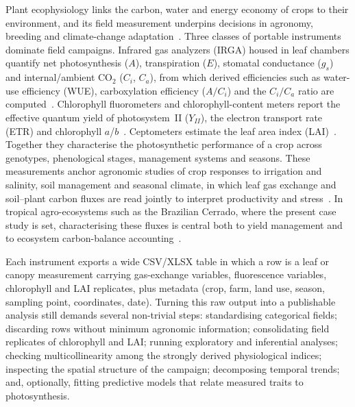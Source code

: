 \documentclass[preprint,12pt,a4paper]{elsarticle}
\begin{document}
Plant ecophysiology links the carbon, water and energy economy of crops to their environment, and its field measurement underpins decisions in agronomy, breeding and climate-change adaptation~\cite{Lambers2008,Long2006}. Three classes of portable instruments dominate field campaigns. Infrared gas analyzers (IRGA) housed in leaf chambers quantify net photosynthesis ($A$), transpiration ($E$), stomatal conductance ($g_s$) and internal/ambient CO$_2$ ($C_i$, $C_a$), from which derived efficiencies such as water-use efficiency (WUE), carboxylation efficiency ($A/C_i$) and the $C_i/C_a$ ratio are computed~\cite{Farquhar1980,vonCaemmerer2000,Long2003}. Chlorophyll fluorometers and chlorophyll-content meters report the effective quantum yield of photosystem~II ($Y_{II}$), the electron transport rate (ETR) and chlorophyll $a$/$b$~\cite{Maxwell2000,Baker2008}. Ceptometers estimate the leaf area index (LAI)~\cite{Breda2003}. Together they characterise the photosynthetic performance of a crop across genotypes, phenological stages, management systems and seasons. These measurements anchor agronomic studies of crop responses to irrigation and salinity, soil management and seasonal climate, in which leaf gas exchange and soil--plant carbon fluxes are read jointly to interpret productivity and stress~\cite{Oliveira2017,Munjonji2021,Peters2012,Sanchez2003,Guarrera2024}. In tropical agro-ecosystems such as the Brazilian Cerrado, where the present case study is set, characterising these fluxes is central both to yield management and to ecosystem carbon-balance accounting~\cite{Vourlitis2022}.

Each instrument exports a wide CSV/XLSX table in which a row is a leaf or canopy measurement carrying gas-exchange variables, fluorescence variables, chlorophyll and LAI replicates, plus metadata (crop, farm, land use, season, sampling point, coordinates, date). Turning this raw output into a publishable analysis still demands several non-trivial steps: standardising categorical fields; discarding rows without minimum agronomic information; consolidating field replicates of chlorophyll and LAI; running exploratory and inferential analyses; checking multicollinearity among the strongly derived physiological indices; inspecting the spatial structure of the campaign; decomposing temporal trends; and, optionally, fitting predictive models that relate measured traits to photosynthesis.
\end{document}
